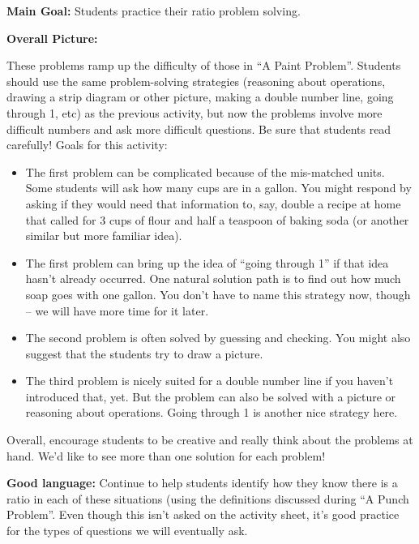 \documentclass[nooutcomes,noauthor,handout]{ximera}
\begin{document}
\newpage
\begin{instructorNotes}

{\bf Main Goal:} Students practice their ratio problem solving.

{\bf Overall Picture:}

These problems ramp up the difficulty of those in ``A Paint Problem''. Students should use the same problem-solving strategies (reasoning about operations, drawing a strip diagram or other picture, making a double number line, going through 1, etc) as the previous activity, but now the problems involve more difficult numbers and ask more difficult questions. Be sure that students read carefully!
Goals for this activity:
\begin{itemize}
    \item The first problem can be complicated because of the mis-matched units. Some students will ask how many cups are in a gallon. You might respond by asking if they would need that information to, say, double a recipe at home that called for 3 cups of flour and half a teaspoon of baking soda (or another similar but more familiar idea).
    \item The first problem can bring up the idea of ``going through 1'' if that idea hasn't already occurred. One natural solution path is to find out how much soap goes with one gallon. You don't have to name this strategy now, though -- we will have more time for it later.
    \item The second problem is often solved by guessing and checking. You might also suggest that the students try to draw a picture.
    \item The third problem is nicely suited for a double number line if you haven't introduced that, yet. But the problem can also be solved with a picture or reasoning about operations. Going through 1 is another nice strategy here. 
\end{itemize}

Overall, encourage students to be creative and really think about the problems at hand. We'd like to see more than one solution for each problem!

{\bf Good language:} Continue to help students identify how they know there is a ratio in each of these situations (using the definitions discussed during ``A Punch Problem''. Even though this isn't asked on the activity sheet, it's good practice for the types of questions we will eventually ask.




\end{instructorNotes}
\end{document}

